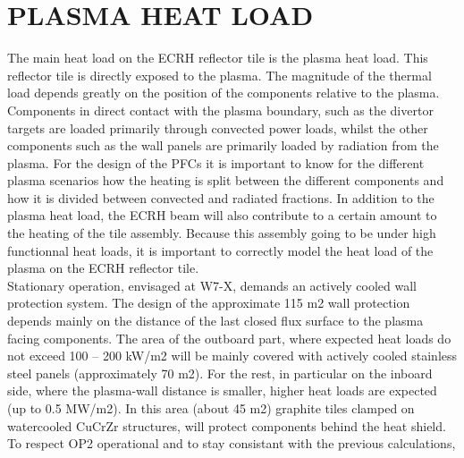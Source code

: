 \section{PLASMA HEAT LOAD}
\normalsize{The main heat load on the \acrshort{ECRH} reflector tile is the plasma heat load. This reflector tile is directly exposed to the plasma. The magnitude of the thermal load depends greatly on the position of the components relative to the plasma. Components in direct contact with the plasma boundary, such as the divertor targets are loaded primarily through convected power loads, whilst the other components such as the wall panels are primarily loaded by radiation from the plasma. For the design of the \acrshort{PFCs} it is important to know for the different plasma scenarios how the heating is split between the different components and how it is divided between convected and radiated fractions. In addition to the plasma heat load, the ECRH beam will also contribute to a certain amount to the heating of the tile assembly. Because this assembly going to be under high functionnal heat loads, it is important to correctly model the heat load of the plasma on the ECRH reflector tile.}
\\
\break
\normalsize{\indent Stationary operation, envisaged at \acrshort{W7-X}, demands an actively cooled wall protection system. The design of the approximate 115 m2 wall protection depends mainly on the distance of the last closed flux surface to the plasma facing components. The area of the outboard part, where expected heat loads do not exceed 100 – 200 kW/m2 will be mainly covered with actively cooled stainless steel panels (approximately 70 m2). For the rest, in particular on the inboard side, where the plasma-wall distance is smaller, higher heat loads are expected (up to 0.5 MW/m2). In this area (about 45 m2) graphite tiles clamped on watercooled CuCrZr structures, will protect components behind the heat shield.}
\\
\break
\normalsize{\indent To respect \acrshort{OP2} operational and to stay consistant with the previous calculations,}
